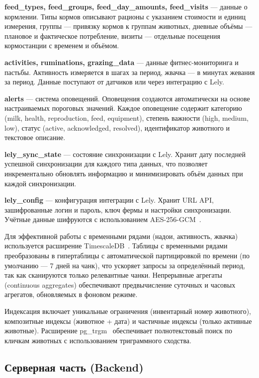\textbf{feed\_types, feed\_groups, feed\_day\_amounts, feed\_visits} --- данные о кормлении. Типы кормов описывают рационы с указанием стоимости и единиц измерения, группы --- привязку кормов к группам животных, дневные объёмы --- плановое и фактическое потребление, визиты --- отдельные посещения кормостанции с временем и объёмом.

\textbf{activities, ruminations, grazing\_data} --- данные фитнес-мониторинга и пастьбы. Активность измеряется в шагах за период, жвачка --- в минутах жевания за период. Данные поступают от датчиков или через интеграцию с Lely.

\textbf{alerts} --- система оповещений. Оповещения создаются автоматически на основе настраиваемых пороговых значений. Каждое оповещение содержит категорию (milk, health, reproduction, feed, equipment), степень важности (high, medium, low), статус (active, acknowledged, resolved), идентификатор животного и текстовое описание.

\textbf{lely\_sync\_state} --- состояние синхронизации с Lely. Хранит дату последней успешной синхронизации для каждого типа данных, что позволяет инкрементально обновлять информацию и минимизировать объём данных при каждой синхронизации.

\textbf{lely\_config} --- конфигурация интеграции с Lely. Хранит URL API, зашифрованные логин и пароль, ключ фермы и настройки синхронизации. Учётные данные шифруются с использованием AES-256-GCM~\cite{AES-GCM}.

Для эффективной работы с временными рядами (надои, активность, жвачка) используется расширение TimescaleDB~\cite{TimescaleDB}. Таблицы с временными рядами преобразованы в гипертаблицы с автоматической партицировкой по времени (по умолчанию --- 7 дней на чанк), что ускоряет запросы за определённый период, так как сканируются только релевантные чанки. Непрерывные агрегаты (continuous aggregates) обеспечивают предвычисление суточных и часовых агрегатов, обновляемых в фоновом режиме.

Индексация включает уникальные ограничения (инвентарный номер животного), композитные индексы (животное + дата) и частичные индексы (только активные животные). Расширение pg\_trgm~\cite{PgTrgm} обеспечивает полнотекстовый поиск по кличкам животных с использованием триграммного сходства.

\subsection{Серверная часть (Backend)}

